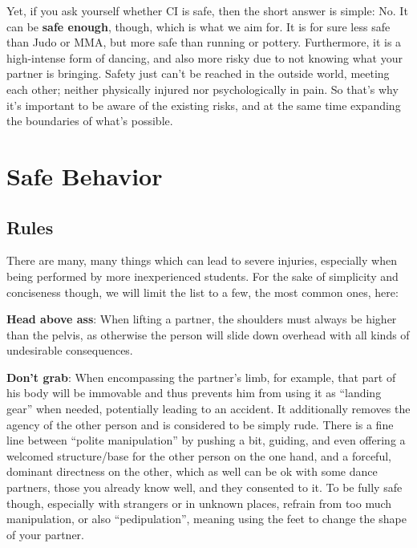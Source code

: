 Yet, if you ask yourself whether CI is safe, then the short answer is simple: No.
It can be \textbf{safe enough}, though, which is what we aim for.
It is for sure less safe than Judo or MMA, but more safe than running or pottery.
Furthermore, it is a high-intense form of dancing, and also more risky due to not knowing what your partner is bringing.
Safety just can't be reached in the outside world, meeting each other; neither physically injured nor psychologically in pain.
So that's why it's important to be aware of the existing risks, and at the same time expanding the boundaries of what's possible.

\section{Safe Behavior}\label{sec:safe-behavior}

\subsection{Rules}\label{subsec:rules}

There are many, many things which can lead to severe injuries, especially when being performed by more inexperienced students.
For the sake of simplicity and conciseness though, we will limit the list to a few, the most common ones, here:

\vspace{10pt}

\noindent \textbf{Head above ass}: When lifting a partner, the shoulders must always be higher than the pelvis, as otherwise the person will slide down overhead with all kinds of undesirable consequences.

\vspace{5pt}
\noindent \textbf{Don't grab}: When encompassing the partner's limb, for example, that part of his body will be immovable and thus prevents him from using it as ``landing gear'' when needed, potentially leading to an accident.
It additionally removes the agency of the other person and is considered to be simply rude.
There is a fine line between ``polite manipulation'' by pushing a bit, guiding, and even offering a welcomed structure/base for the other person on the one hand, and a forceful, dominant directness on the other, which as well can be ok with some dance partners, those you already know well, and they consented to it.
To be fully safe though, especially with strangers or in unknown places, refrain from too much manipulation, or also ``pedipulation'', meaning using the feet to change the shape of your partner.

